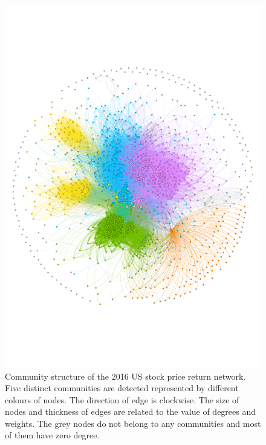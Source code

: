 \begin{figure}
	\begin{center}
		\includegraphics[width=14cm]{community_graph}
	\end{center}
	\caption{Community structure of the 2016 US stock price return network. Five distinct communities are detected represented by different colours of nodes. The direction of edge is  clockwise. The size of nodes and thickness of edges are related to the value of degrees and weights. The grey nodes do not belong to any communities and most of them have zero degree.}
	\label{fig:community_graph}
\end{figure}

